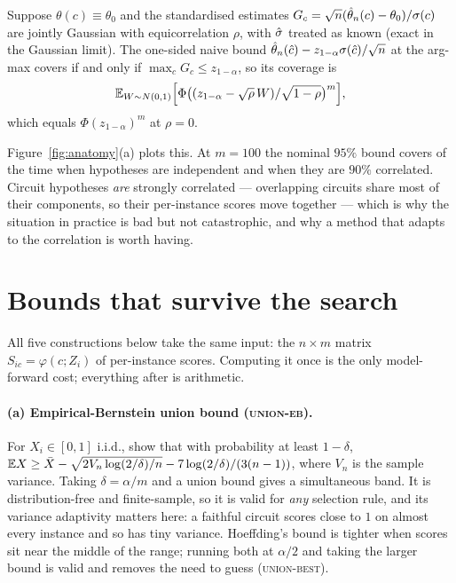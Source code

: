 \begin{proposition}
\label{prop:naivecov}
Suppose $\theta(c)\equiv\theta_0$ and the standardised estimates
$G_c=\sqrt n(\hat{\theta}_n(c)-\theta_0)/\sigma(c)$ are jointly Gaussian with
equicorrelation $\rho$, with $\hat{\sigma}$ treated as known (exact in the Gaussian
limit). The one-sided naive bound
$\hat{\theta}_n(\hat{c})-z_{1-\alpha}\sigma(\hat{c})/\sqrt n$ at the arg-max covers
if and only if $\max_c G_c \le z_{1-\alpha}$, so its coverage is
\[
\mathbb{E}_{W\sim N(0,1)}\Big[\Phi\big((z_{1-\alpha}-\sqrt{\rho}\,W)/\sqrt{1-\rho}\big)^{m}\Big],
\]
which equals $\Phi(z_{1-\alpha})^m$ at $\rho=0$.
\end{proposition}

Figure~\ref{fig:anatomy}(a) plots this. At $m=100$ the nominal $95\%$ bound
covers \MyNaiveCovHundred{} of the time when hypotheses are independent and
\MyNaiveCovHundredRhoNine{} when they are $90\%$ correlated. Circuit hypotheses
\emph{are} strongly correlated --- overlapping circuits share most of their
components, so their per-instance scores move together --- which is why the
situation in practice is bad but not catastrophic, and why a method that adapts
to the correlation is worth having.

\section{Bounds that survive the search}
\label{sec:methods}

All five constructions below take the same input: the $n\times m$ matrix
$S_{ic}=\varphi(c;Z_i)$ of per-instance scores. Computing it once is the only
model-forward cost; everything after is arithmetic.

\paragraph{(a) Empirical-Bernstein union bound (\textsc{union-eb}).}
For $X_i\in[0,1]$ i.i.d., \citet{maurer2009empirical} show that with probability
at least $1-\delta$,
$\mathbb{E} X \ge \bar X - \sqrt{2 V_n \log(2/\delta)/n} - 7\log(2/\delta)/(3(n-1))$,
where $V_n$ is the sample variance. Taking $\delta=\alpha/m$ and a union bound
gives a simultaneous band. It is distribution-free and finite-sample, so it is
valid for \emph{any} selection rule, and its variance adaptivity matters here:
a faithful circuit scores close to $1$ on almost every instance and so has tiny
variance. Hoeffding's bound is tighter when scores sit near the middle of the
range; running both at $\alpha/2$ and taking the larger bound is valid and
removes the need to guess (\textsc{union-best}).

